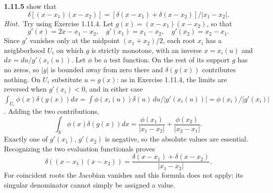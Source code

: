 \par\bigskip
\noindent\textbf{1.11.5}\quad {} show that
\[
\delta[(x-x_{1})(x-x_{2})]
=[\delta(x-x_{1})+\delta(x-x_{2})]/|x_{1}-x_{2}|.
\]
\emph{Hint.}~Try using Exercise 1.11.4.
\solution
{}
Let $g(x)=(x-x_1)(x-x_2)$, so that
\[
 g'(x)=2x-x_1-x_2,\quad
 g'(x_1)=x_1-x_2,\quad g'(x_2)=x_2-x_1.
\]
Since $g'$ vanishes only at the midpoint $(x_1+x_2)/2$, each root
$x_i$ has a neighborhood $U_i$ on which $g$ is strictly monotone, with
an inverse $x=x_i(u)$ and $dx=du/g'(x_i(u))$. Let $\phi$ be a test
function. On the rest of its support $g$ has no zeros, so $|g|$ is
bounded away from zero there and $\delta(g(x))$ contributes nothing.
On $U_i$ substitute $u=g(x)$: as in Exercise 1.11.4, the limits are
reversed when $g'(x_i)<0$, and in either case
$\int_{U_i}\phi(x)\delta(g(x))dx
=\int\phi(x_i(u))\delta(u)\,du/|g'(x_i(u))|=\phi(x_i)/|g'(x_i)|$.
Adding the two contributions,
\[
 \int_{\mathbb R}\phi(x)\delta(g(x))dx
 =\frac{\phi(x_1)}{|x_1-x_2|}+\frac{\phi(x_2)}{|x_2-x_1|}.
\]
Exactly one of $g'(x_1)$, $g'(x_2)$ is negative, so the absolute values
are essential. Recognizing the two evaluation functionals proves
\[
 \delta((x-x_1)(x-x_2))
 =\frac{\delta(x-x_1)+\delta(x-x_2)}{|x_1-x_2|}.
\]
For coincident roots the Jacobian vanishes and this formula does not
apply; its singular denominator cannot simply be assigned a value.


